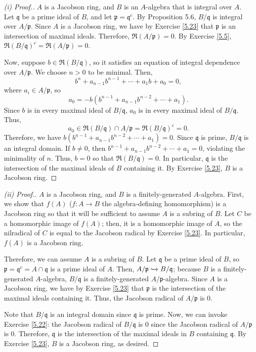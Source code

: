 \begin{proof}[(i) Proof.]
$A$ is a Jacobson ring, and $B$ is an $A$-algebra that is integral over $A$. Let $\mathfrak{q}$ be a prime ideal of $B$, and let 
$\mathfrak{p} = \mathfrak{q}^c$. By Proposition 5.6, $B/\mathfrak{q}$ is integral over $A/\mathfrak{p}$. Since $A$ is a Jacobson
ring, we have by Exercise \ref{5.23} that $\mathfrak{p}$ is an intersection of maximal ideals. Therefore, $\mathfrak{R}(A/\mathfrak{p}) = 0$.
By Exercise \ref{5.5}, $\mathfrak{R}(B/\mathfrak{q})^c = \mathfrak{R}(A/\mathfrak{p}) = 0$.

Now, suppose $b \in \mathfrak{R}(B/\mathfrak{q})$, so it satisfies an equation of integral dependence over $A/\mathfrak{p}$. We choose $n > 0$
to be minimal. Then,
$$b^n + a_{n-1}b^{n-1} + \cdots + a_1 b + a_0 = 0,$$
where $a_i \in A/\mathfrak{p}$, so
$$a_0 = - b (b^{n-1} + a_{n-1}b^{n-2} + \cdots + a_1).$$
Since $b$ is in every maximal ideal of $B/\mathfrak{q}$, $a_0$ is in every maximal ideal of $B/\mathfrak{q}$. Thus, 
$$a_0 \in \mathfrak{R}(B/\mathfrak{q}) \cap A/\mathfrak{p} = \mathfrak{R}(B/\mathfrak{q})^c = 0.$$
Therefore, we have $b(b^{n-1} + a_{n-1}b^{n-2} + \cdots + a_1) = 0$. Since $\mathfrak{q}$ is prime, $B/\mathfrak{q}$ is an integral domain. If $b \neq 0$,
then $b^{n-1} + a_{n-1}b^{n-2} + \cdots + a_1 = 0$, violating the minimality of $n$. Thus, $b = 0$ so that $\mathfrak{R}(B/\mathfrak{q}) = 0$. In particular,
$\mathfrak{q}$ is the intersection of the maximal ideals of $B$ containing it. By Exercise \ref{5.23}, $B$ is a Jacobson ring.
\end{proof}

\begin{proof}[(ii) Proof.]
$A$ is a Jacobson ring, and $B$ is a finitely-generated $A$-algebra. First, we show that $f(A)$ ($f : A \to B$ the algebra-defining homomorphism) is a
Jacobson ring so that it will be sufficient to assume $A$ is a subring of $B$. Let $C$ be a homomorphic image of $f(A)$; then, it is a homomorphic image
of $A$, so the nilradical of $C$ is equal to the Jacobson radical by Exercise \ref{5.23}. In particular, $f(A)$ is a Jacobson ring.

Therefore, we can assume $A$ is a subring of $B$. Let $\mathfrak{q}$ be a prime ideal of $B$, so $\mathfrak{p} = \mathfrak{q}^c = A \cap \mathfrak{q}$ is 
a prime ideal of $A$. Then, $A/\mathfrak{p} \xhookrightarrow{} B/\mathfrak{q}$; because $B$ is a finitely-generated $A$-algebra, $B/\mathfrak{q}$ is a
finitely-generated $A/\mathfrak{p}$-algebra. Since $A$ is a Jacobson ring, we have by Exercise \ref{5.23} that $\mathfrak{p}$ is the intersection of the
maximal ideals containing it. Thus, the Jacobson radical of $A/\mathfrak{p}$ is $0$.

Note that $B/\mathfrak{q}$ is an integral domain since $\mathfrak{q}$ is prime. Now, we can invoke Exercise \ref{5.22}: the Jacobson radical of $B/\mathfrak{q}$ 
is $0$ since the Jacobson radical of $A/\mathfrak{p}$ is $0$. Therefore, $\mathfrak{q}$ is the intersection of the maximal ideals in $B$ containing $\mathfrak{q}$.
By Exercise \ref{5.23}, $B$ is a Jacobson ring, as desired.
\end{proof}

